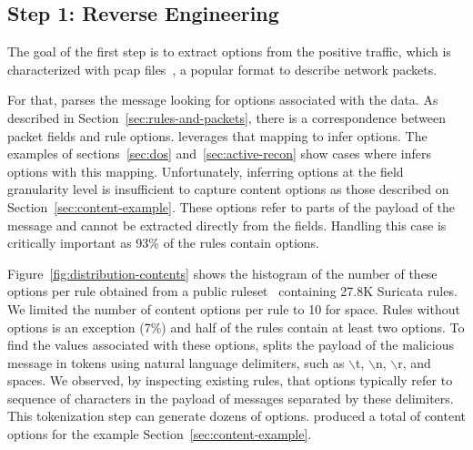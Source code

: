 \documentclass[sigconf,review, anonymous]{acmart}
\begin{document}



\subsection{Step 1: Reverse Engineering}

The goal of the first step is to extract options from the positive
traffic, which is characterized with pcap files~\cite{pcap}, a popular
format to describe network packets.

For that, \tname{} parses the message looking for options associated
with the data. As described in Section~\ref{sec:rules-and-packets},
there is a correspondence between packet fields and rule
options. \tname{} leverages that mapping to infer options. The
examples of sections~\ref{sec:dos} and~\ref{sec:active-recon} show
cases where \tname{} infers options with this mapping. Unfortunately,
inferring options at the field granularity level is insufficient to
capture content options as those described on
Section~\ref{sec:content-example}. These options refer to parts of the
payload of the message and cannot be extracted directly from the
fields. Handling this case is critically important as 93\% of the
rules contain  options.


Figure~\ref{fig:distribution-contents} shows the histogram of the
number of these options per rule obtained from a public
ruleset~\cite{emerging-threats-open} containing 27.8K Suricata
rules. We limited the number of content options per rule to 10 for
space. Rules without  options is an exception
(7\%) and half of the rules contain at least two
 options.  To find the values associated with these
options, \tname{} splits the payload of the malicious message in
tokens using natural language delimiters, such as $\backslash$t,
$\backslash$n, $\backslash$r, and spaces. We observed, by inspecting
existing rules, that  options typically refer to
sequence of characters in the payload of messages separated by these
delimiters. This tokenization step can generate dozens of options.
\tname{} produced a total of  content options for the example
Section~\ref{sec:content-example}.
\end{document}
